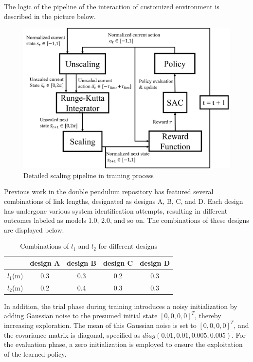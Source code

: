 The logic of the pipeline of the interaction of customized environment is described in the picture below.

\begin{figure}[H]
    \centering
    \includegraphics[width=0.85\linewidth]{figures/simulation_result/scaling_mechanism.png}
    \caption{Detailed scaling pipeline in training process}
    \label{fig:scasling_mech}
\end{figure}

Previous work in the double pendulum repository has featured several combinations of link lengths, designated as designs A, B, C, and D. Each design has undergone various system identification attempts, resulting in different outcomes labeled as models 1.0, 2.0, and so on. The combinations of these designs are displayed below:

\begin{table}[ht]
\centering
\begin{tabular}{|c|c|c|c|c|}
\hline
  & design A & design B & design C & design D \\
\hline
$l_1$(m) & 0.3 & 0.3 & 0.2 & 0.3 \\
\hline
$l_2$(m) & 0.2 & 0.4 & 0.3 & 0.3 \\
\hline
\end{tabular}
\caption{Combinations of $l_1$ and $l_2$ for different designs}
\label{tab:different_designs}
\end{table}

In addition, the trial phase during training introduces a noisy initialization by adding Gaussian noise to the presumed initial state \([0,0,0,0]^T\), thereby increasing exploration. The mean of this Gaussian noise is set to \([0,0,0,0]^T\), and the covariance matrix is diagonal, specified as \(diag(0.01,0.01,0.005,0.005) \). For the evaluation phase, a zero initialization is employed to ensure the exploitation of the learned policy.

